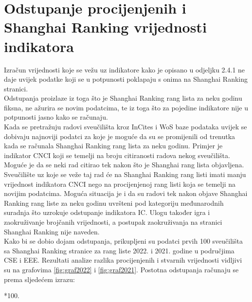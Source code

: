 \documentclass[times, utf8, zavrsni]{fer}
\begin{document}
\section{Odstupanje procijenjenih i Shanghai Ranking vrijednosti indikatora}
Izračun vrijednosti koje se vežu uz indikatore kako je opisano u odjeljku 2.4.1 ne daje uvijek podatke koji se u potpunosti poklapaju s onima na 
Shanghai Ranking stranici.
\\Odstupanja proizlaze iz toga što je Shanghai Ranking rang lista za neku godinu fiksna, ne ažurira se novim podatcima, te iz toga što za pojedine 
indikatore nije u potpunosti jasno kako se računaju. \\Kada se pretražuju radovi sveučilišta
kroz InCites i WoS baze podataka uvijek se dobivaju najnoviji podatci za koje je moguće da su se promijenili od trenutka kada se računala Shanghai Ranking rang lista za neku godinu.
Primjer je indikator CNCI koji se temelji na broju citiranosti radova nekog sveučilišta. Moguće je da se neki rad citirao tek nakon što je Shanghai rang lista objavljena. Sveučilište uz 
koje se veže taj rad će na Shanghai Ranking rang listi imati manju vrijednost indikatora CNCI nego na procijenjenoj rang listi koja se temelji na novijim podatcima. 
Moguća situacija je i da su radovi tek nakon objave Shanghai Ranking rang liste za neku godinu uvršteni pod kategoriju međunarodnih suradnja što uzrokuje odstupanje 
indikatora IC. Ulogu također igra i zaokruživanje brojčanih vrijednosti, a postupak zaokruživanja na stranici Shanghai Ranking nije naveden.
\\Kako bi se dobio dojam odstupanja, prikupljeni su podatci prvih 100 sveučilišta sa Shanghai Ranking stranice za rang liste 2022. i 2021. godine u područjima CSE i EEE. 
Rezultati analize razlika procijenjenih i stvarnih vrijednosti vidljivi su na grafovima \ref{fig:graf2022} i \ref{fig:graf2021}. Postotna odstupanja računaju se prema sljedećem izrazu:
\begin{myequation}%
    *100.
    \end{myequation}
\end{document}
